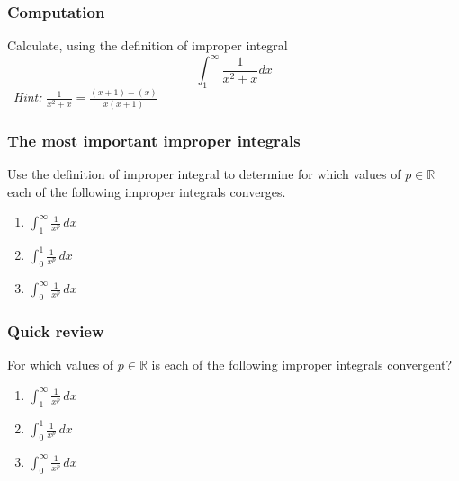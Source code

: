 \documentclass[14pt]{beamer}
\newcommand{\R}{\mathbb{R}}
\begin{document}
	\begin{frame}[t]
		\frametitle{Computation}

		Calculate, using the definition of improper integral
		\[
			\int_{1}^{\infty}\frac{1}{x^{2}+x}dx
		\]
		\
 \emph{Hint:}
		${\displaystyle \frac{1}{x^{2}+x} = \frac{(x+1) - (x)}{x(x+1)}}$
	\end{frame}
	\begin{frame}[t]
		\frametitle{The most important improper integrals}

		Use the definition of improper integral to determine for which values of
		${\displaystyle p \in \R}$ each of the following improper integrals
		converges.

		\begin{enumerate}
			\item ${\displaystyle \int_1^{\infty} \frac{1}{x^{p}} \, dx }$
				\vfill

			\item ${\displaystyle \int_0^1 \frac{1}{x^{p}} \, dx }$
				\vfill

			\item ${\displaystyle \int_0^{\infty} \frac{1}{x^{p}} \, dx }$
				\vfill
		\end{enumerate}
	\end{frame}
	\begin{frame}[t]
		\frametitle{Quick review}

		For which values of ${\displaystyle p \in \R}$ is each of the following
		improper integrals convergent?

		\begin{enumerate}
			\item ${\displaystyle \int_1^{\infty} \frac{1}{x^{p}} \, dx }$

				\vfill

			\item ${\displaystyle \int_0^1 \frac{1}{x^{p}} \, dx }$

				\vfill

			\item ${\displaystyle \int_0^{\infty} \frac{1}{x^{p}} \, dx }$
		\end{enumerate}
	\end{frame}
\end{document}
